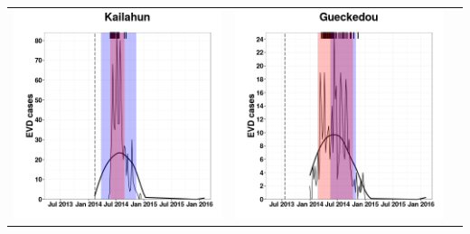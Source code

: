 \documentclass[portrait,final,a0paper,fontscale=0.277]{baposter}
\begin{document}
\begin{poster}
{\begin{tabular}{ccc}
           \includegraphics[scale=0.268]{images/maxCases_Kailahun.png}&
           \includegraphics[scale=0.268]{images/maxCases_Gueckedou.png}
\end{tabular}
}

\end{poster}
\end{document}
